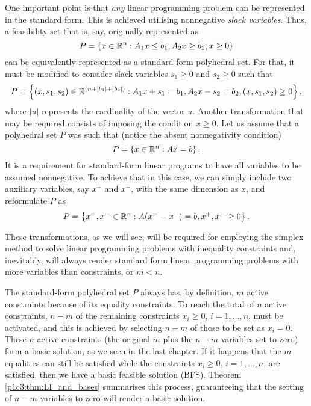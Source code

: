 One important point is that \emph{any} linear programming problem can be represented in the standard form. This is achieved utilising nonnegative \emph{slack variables}. Thus, a feasibility set that is, say, originally represented as
%
\begin{equation*}
	P = \left\{ x \in \mathbb{R}^n : A_1 x \le b_1, A_2x \ge b_2, x \ge 0 \right \}
\end{equation*}
%
can be equivalently represented as a standard-form polyhedral set. For that, it must be modified to consider slack variables $s_1 \ge 0$ and $s_2 \geq 0$ such that
%
\begin{equation*}
	P = \left\{ (x, s_1, s_2) \in \mathbb{R}^{(n + |b_1| + |b_2|)} : A_1 x + s_1 = b_1, A_2x - s_2 = b_2, (x, s_1, s_2) \ge 0 \right \},
\end{equation*}
%
where $|u|$ represents the cardinality of the vector $u$. Another transformation that may be required consists of imposing the condition $x \ge 0$. Let us assume that a polyhedral set $P$ was such that (notice the absent nonnegativity condition)
%
\begin{equation*}
	P = \left\{ x \in \mathbb{R}^n : Ax = b \right \}.		
\end{equation*}
%
It is a requirement for standard-form linear programs to have all variables to be assumed nonnegative. To achieve that in this case, we can simply include two auxiliary variables, say $x^+$ and $x^-$, with the same dimension as $x$, and reformulate $P$ as
\begin{equation*}
	P = \left\{ x^+,x^- \in \mathbb{R}^n : A(x^+ - x^-) = b, x^+, x^- \ge 0 \right \}.		
\end{equation*}
%

These transformations, as we will see, will be required for employing the simplex method to solve linear programming problems with inequality constraints and, inevitably, will always render standard form linear programming problems with more variables than constraints, or $m < n$.

The standard-form polyhedral set $P$ always has, by definition, $m$ active constraints because of its equality constraints. To reach the total of $n$ active constraints, $n-m$ of the remaining constraints $x_i \ge 0$, $i =1,\dots, n$, must be activated, and this is achieved by selecting $n-m$ of those to be set as $x_i = 0$. These $n$ active constraints (the original $m$ plus the $n-m$ variables set to zero) form a basic solution, as we seen in the last chapter. If it happens that the $m$ equalities can still be satisfied while the constraints $x_i \ge 0$, $i =1,\dots, n$, are satisfied, then we have a basic feasible solution (BFS). Theorem \ref{p1c3:thm:LI_and_bases} summarises this process, guaranteeing that the setting of $n-m$ variables to zero will render a basic solution.

